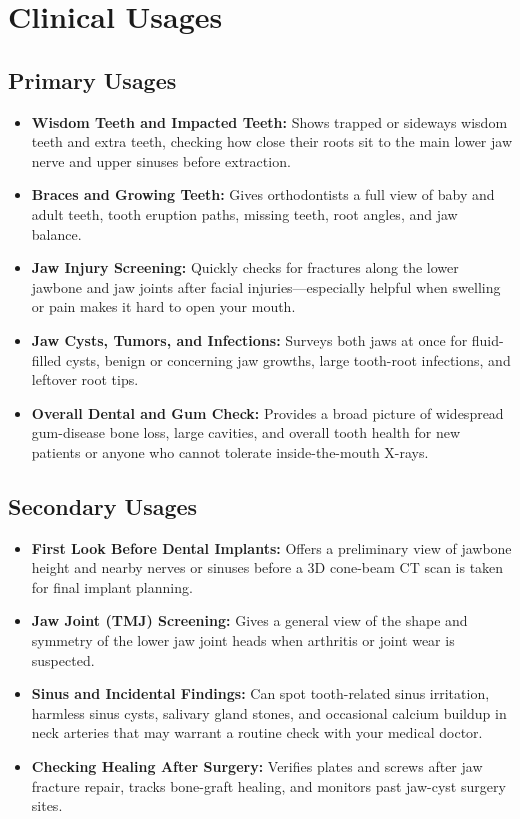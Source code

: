 \section{Clinical Usages}

\subsection{Primary Usages}
\begin{itemize}
\item \textbf{Wisdom Teeth and Impacted Teeth:} Shows trapped or sideways wisdom teeth and extra teeth, checking how close their roots sit to the main lower jaw nerve and upper sinuses before extraction.
\item \textbf{Braces and Growing Teeth:} Gives orthodontists a full view of baby and adult teeth, tooth eruption paths, missing teeth, root angles, and jaw balance.
\item \textbf{Jaw Injury Screening:} Quickly checks for fractures along the lower jawbone and jaw joints after facial injuries---especially helpful when swelling or pain makes it hard to open your mouth.
\item \textbf{Jaw Cysts, Tumors, and Infections:} Surveys both jaws at once for fluid-filled cysts, benign or concerning jaw growths, large tooth-root infections, and leftover root tips.
\item \textbf{Overall Dental and Gum Check:} Provides a broad picture of widespread gum-disease bone loss, large cavities, and overall tooth health for new patients or anyone who cannot tolerate inside-the-mouth X-rays.
\end{itemize}

\subsection{Secondary Usages}
\begin{itemize}
\item \textbf{First Look Before Dental Implants:} Offers a preliminary view of jawbone height and nearby nerves or sinuses before a 3D cone-beam CT scan is taken for final implant planning.
\item \textbf{Jaw Joint (TMJ) Screening:} Gives a general view of the shape and symmetry of the lower jaw joint heads when arthritis or joint wear is suspected.
\item \textbf{Sinus and Incidental Findings:} Can spot tooth-related sinus irritation, harmless sinus cysts, salivary gland stones, and occasional calcium buildup in neck arteries that may warrant a routine check with your medical doctor.
\item \textbf{Checking Healing After Surgery:} Verifies plates and screws after jaw fracture repair, tracks bone-graft healing, and monitors past jaw-cyst surgery sites.
\end{itemize}


